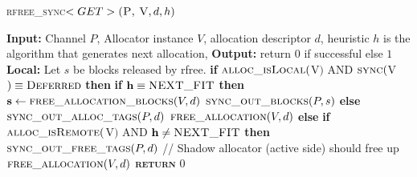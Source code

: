 \documentclass[10pt]{article}
\begin{document}
\begin{algorithm}{}
\footnotesize
\caption{\textsc{rfree\_sync}{$<GET>\textsc{(P, V}, d, h)$}}
\label{alg:rfree_sync_GET} 
\begin{algorithmic}[1]


\STATE \textbf{Input:} Channel $P$, Allocator instance $V$, allocation descriptor $d$, heuristic $h$
is the algorithm that generates next allocation, 
\STATE \textbf{Output:} return {$0$} if successful else {$1$}
\STATE \textbf{Local:} Let $s$ be blocks released by rfree.
\STATE \textbf{if} $\textsc{alloc\_isLocal}($V$)$ AND $\textsc{sync}($V$) \equiv \textsc{Deferred}$  \textbf{then} 
\STATE \quad \textbf{if} $\textbf{h} \equiv \textsc{NEXT\_FIT}$  \textbf{then}
\STATE \qquad $\textbf{s} \leftarrow  \textsc{free\_allocation\_blocks}(V, d)$ 
\STATE \qquad $\textsc{sync\_out\_blocks}(P, s)$
\STATE \quad \textbf{else}
\STATE \qquad $\textsc{sync\_out\_alloc\_tags}(P, d)$
\STATE \qquad $\textsc{free\_allocation}(V, d)$ 
\STATE \textbf{else}
\STATE \qquad \textbf{if} $\textsc{alloc\_isRemote}($V$)$ AND $\textbf{h} \neq \textsc{NEXT\_FIT}$ \textbf{then}
\STATE \qquad \quad $\textsc{sync\_out\_free\_tags}(P,d)$ // Shadow allocator (active side) should free up 
\STATE \qquad $\textsc{free\_allocation}(V, d)$ 
\STATE \textsc{\textbf{return}} {$0$}
\STATE


\end{algorithmic}
\end{algorithm}


\end{document}
